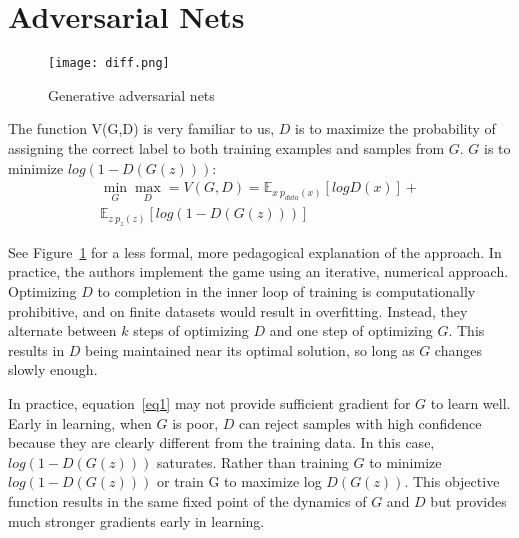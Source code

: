 \documentclass[10pt,twocolumn,letterpaper]{article}
\begin{document}
\section{Adversarial Nets}
\begin{figure}[!htb]
	\centering
	\texttt{[image: diff.png]}\\
	\caption{Generative adversarial nets}\label{Figure1}
\end{figure}
The function V(G,D) is very familiar to us, $D$ is to maximize the probability of assigning the correct label to both training examples and samples from $G$. $G$ is to minimize $log(1 − D(G(z)))$:
\begin{equation}
\begin{split}
\min_{G}\max_{D}=V(G,D)=\mathbb{E}_{x~p_{data}(x)}[logD(x)]+
\\\mathbb{E}_{z~p_{z}(z)}[log(1-D(G(z)))]
\end{split}
\label{eq1}
\end{equation}
\par See Figure~\ref{Figure1} for a less formal, more pedagogical explanation of the approach. In practice, the authors implement the game using an iterative, numerical approach. Optimizing $D$ to completion in the inner loop of training is computationally prohibitive, and on finite datasets would result in overfitting. Instead, they alternate between $k$ steps of optimizing $D$ and one step of optimizing $G$. This results in $D$ being maintained near its optimal solution, so long as $G$ changes slowly enough.
\par In practice, equation~\ref{eq1} may not provide sufficient gradient for $G$ to learn well. Early in learning, when $G$ is poor, $D$ can reject samples with high confidence because they are clearly different from
the training data. In this case, $log(1 − D(G(z)))$ saturates. Rather than training $G$ to minimize $log(1 − D(G(z)))$ or train G to maximize log $D(G(z))$. This objective function results in the same fixed point of the dynamics of $G$ and $D$ but provides much stronger gradients early in learning.
\end{document}
